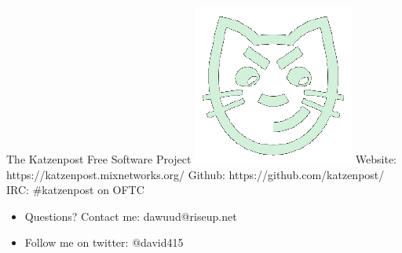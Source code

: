 \documentclass[fleqn,xcolor={usenames,dvipsnames}]{beamer} %
\begin{document}
\begin{frame}{The Katzenpost Free Software Project}
  \includegraphics[scale=0.25]{pics/katzenpost}
  \newline
  \newline
  Website:
  \newline
  https://katzenpost.mixnetworks.org/
  \newline
  \newline
  Github:
  \newline
  https://github.com/katzenpost/
  \newline
  \newline
  IRC: \#katzenpost on OFTC
  \vspace{5mm}
  \begin{itemize}
  \item Questions? Contact me: dawuud@riseup.net
  \item Follow me on twitter: @david415
  \end{itemize}    
\end{frame}
\end{document}
